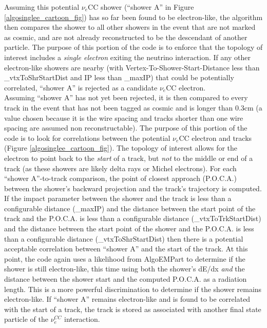Assuming this potential $\nu_e$CC shower (``shower A'' in Figure \ref{algosinglee_cartoon_fig}) has so far been found to be electron-like, the algorithm then compares the shower to all other showers in the event that are not marked as cosmic, and are not already reconstructed to be the descendant of another particle. The purpose of this portion of the code is to enforce that the topology of interest includes a \textit{single electron} exiting the neutrino interaction. If any other electron-like showers are nearby (with Vertex-To-Shower-Start-Distance less than \_vtxToShrStartDist and IP less than \_maxIP) that could be potentially correlated, ``shower A'' is rejected as a candidate $\nu_e$CC electron.\\

Assuming ``shower A'' has not yet been rejected, it is then compared to every track in the event that has not been tagged as cosmic and is longer than 0.3cm (a value chosen because it is the wire spacing and tracks shorter than one wire spacing are assumed non reconstructable). The purpose of this portion of the code is to look for correlations between the potential $\nu_e$CC electron and tracks (Figure \ref{algosinglee_cartoon_fig}). The topology of interest allows for the electron to point back to the \textit{start} of a track, but \textit{not} to the middle or end of a track (as these showers are likely delta rays or Michel electrons). For each ``shower A''-to-track comparison, the point of closest approach (P.O.C.A.) between the shower's backward projection and the track's trajectory is computed. If the impact parameter between the shower and the track is less than a configurable distance (\_maxIP) and the distance between the start point of the track and the P.O.C.A. is less than a configurable distance (\_vtxToTrkStartDist) and the distance between the start point of the shower and the P.O.C.A. is less than a configurable distance (\_vtxToShrStartDist) then there is a potential acceptable correlation between ``shower A'' and the start of the track. At this point, the code again uses a likelihood from AlgoEMPart to determine if the shower is still electron-like, this time using both the shower's dE/dx \textit{and} the distance between the shower start and the computed P.O.C.A. as a radiation length. This is a more powerful discrimination to determine if the shower remains electron-like. If ``shower A'' remains electron-like and is found to be correlated with the start of a track, the track is stored as associated with another final state particle of the $\nu_e^{CC}$ interaction.\\

